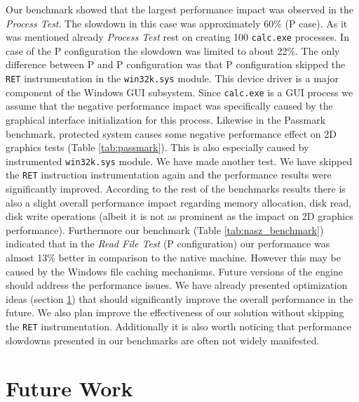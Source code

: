 \documentclass[10pt,twocolumn,a4paper]{article}
\begin{document}
Our benchmark showed that the largest performance impact was observed in the {\textit{Process Test}}. The slowdown in this case was approximately 60\% (P case). As it was mentioned already {\textit{Process Test}} rest on creating 100 {\tt{calc.exe}} processes. In case of the P configuration the slowdown was limited to about 22\%. The only difference between P and P configuration was that P configuration skipped the {\tt{RET}} instrumentation in the {\tt{win32k.sys}} module. This device driver is a major component of the Windows GUI subsystem. Since {\tt{calc.exe}} is a GUI process we assume that the negative performance impact was specifically caused by the graphical interface initialization for this process. Likewise in the Passmark benchmark, protected system causes some negative performance effect on 2D graphics tests (Table \ref{tab:passmark}). This is also especially caused by instrumented {\tt{win32k.sys}} module. We have made another test. We have skipped the {\tt{RET}} instruction instrumentation again and the performance results were significantly improved. According to the rest of the benchmarks results there is also a slight overall performance impact regarding memory allocation, disk read, disk write operations (albeit it is not as prominent as the impact on 2D graphics performance). Furthermore our benchmark (Table \ref{tab:nasz_benchmark}) indicated that in the {\textit{Read File Test}} (P configuration) our performance was almost 13\% better in comparison to the native machine. However this may be caused by the Windows file caching mechanisms. 
{\newline\indent}Future versions of the engine should address the performance issues. We have already presented optimization ideas (section \ref{sec:future_work}) that should significantly improve the overall performance in the future. We also plan improve the effectiveness of our solution without skipping the {\tt{RET}} instrumentation. Additionally it is also worth noticing that performance slowdowns presented in our benchmarks are often not widely manifested. 


\section{Future Work}\label{sec:future_work}
\end{document}
